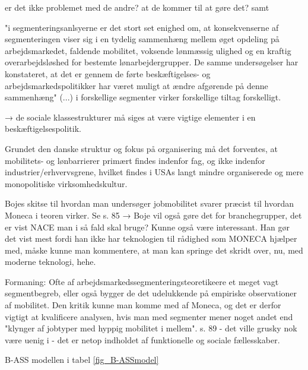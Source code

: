  er det ikke problemet med de andre? at de kommer til at gøre det? samt


"i segmenteringsanlsyerne er det stort set enighed om, at konsekvenserne af segmenteringen viser sig i en tydelig sammenhæng mellem øget opdeling på arbejdsmarkedet, faldende mobilitet, voksende lønmæssig ulighed og en kraftig overarbejdsløshed for bestemte lønarbejdergrupper. De samme undersøgelser har konstateret, at det er gennem de førte beskæftigelses- og arbejdsmarkedspolitikker har været muligt at ændre afgørende på denne sammenhæng" (...) i forskellige segmenter virker forskellige tiltag forskelligt.


→ de sociale klassestrukturer må siges at være vigtige elementer i en beskæftigelsespolitik. 


Grundet den danske struktur og fokus på organisering må det forventes, at mobilitets- og lønbarrierer primært findes indenfor fag, og ikke indenfor industrier/erhvervsgrene, hvilket findes i USAs langt mindre organiserede og mere monopolitiske virksomhedskultur. 



Bojes skitse til hvordan man undersøger jobmobilitet svarer præcist til hvordan Moneca i teoren virker. Se s. 85
→ Boje vil også gøre det for branchegrupper, det er vist NACE man i så fald skal bruge? Kunne også være interessant. Han gør det vist mest fordi han ikke har teknologien til rådighed som MONECA hjælper med, måske kunne man kommentere, at man kan springe det skridt over, nu, med moderne teknologi, hehe.

Formaning: Ofte af arbejdsmarkedssegmenteringsteoretikeere et meget vagt segmentbegreb, eller også bygger de det udelukkende på empiriske observationer af mobilitet. Den kritik kunne man komme med af Moneca, og det er derfor vigtigt at kvalificere analysen, hvis man med segmenter mener noget andet end "klynger af jobtyper med hyppig mobilitet i mellem". s. 89
 - det ville grusky nok være uenig i - det er netop indholdet af funktionelle og sociale fællesskaber. 



B-ASS modellen i tabel \ref{fig_B-ASSmodel} 











